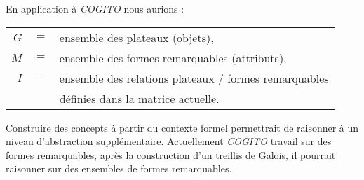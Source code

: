 En application à \emph{COGITO} nous aurions :

\begin{tabular}{r c l}
$G$ & $ = $ & ensemble des plateaux (objets),\\
$M$ & $ = $ & ensemble des formes remarquables (attributs),\\
$I$ & $ = $ & ensemble des relations plateaux / formes remarquables\\
& & définies dans la matrice actuelle.\\
\end{tabular}

Construire des concepts à partir du contexte formel permettrait de raisonner à un niveau d'abstraction supplémentaire. Actuellement \emph{COGITO} travail sur des formes remarquables, après la construction d'un treillis de Galois, il pourrait raisonner sur des ensembles de formes remarquables.

